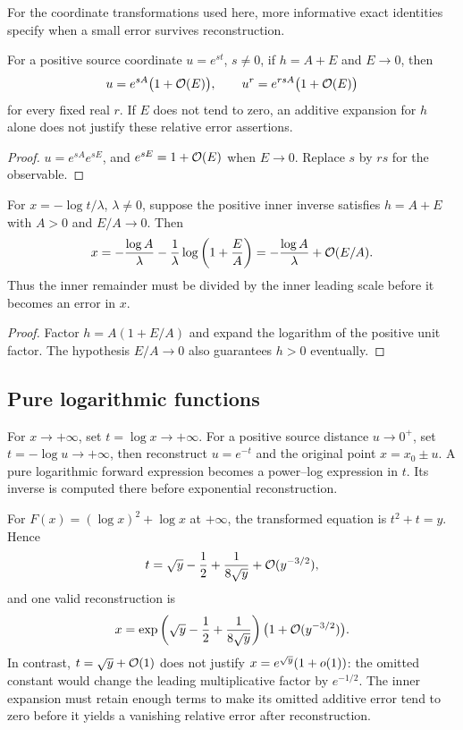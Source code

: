 For the coordinate transformations used here, more informative exact identities specify when a small error survives reconstruction.

\begin{corollary}
\label{cor:exponential-reconstruction}
For a positive source coordinate $u=e^{s t}$, $s\ne0$, if $h=A+E$ and $E\to0$, then
\begin{equation}
 u=e^{sA}\bigl(1+\mathcal O(E)\bigr),\qquad
 u^r=e^{rsA}\bigl(1+\mathcal O(E)\bigr)
 \label{eq:exponential-reconstruction}
\end{equation}
for every fixed real $r$. If $E$ does not tend to zero, an additive expansion for $h$ alone does not justify these relative error assertions.
\end{corollary}
\begin{proof}
$u=e^{sA}e^{sE}$, and $e^{sE}=1+\mathcal O(E)$ when $E\to0$. Replace $s$ by $rs$ for the observable.
\end{proof}

\begin{corollary}
\label{cor:logarithmic-reconstruction}
For $x=-\log t/\lambda$, $\lambda\ne0$, suppose the positive inner inverse satisfies $h=A+E$ with $A>0$ and $E/A\to0$. Then
\begin{equation}
 x=-\frac{\log A}{\lambda}
 -\frac1\lambda\log\left(1+\frac EA\right)
 =-\frac{\log A}{\lambda}+\mathcal O(E/A).
 \label{eq:logarithmic-reconstruction}
\end{equation}
Thus the inner remainder must be divided by the inner leading scale before it becomes an error in $x$.
\end{corollary}
\begin{proof}
Factor $h=A(1+E/A)$ and expand the logarithm of the positive unit factor. The hypothesis $E/A\to0$ also guarantees $h>0$ eventually.
\end{proof}

\subsection{Pure logarithmic functions}

For $x\to+\infty$, set $t=\log x\to+\infty$. For a positive source distance $u\to0^+$, set $t=-\log u\to+\infty$, then reconstruct $u=e^{-t}$ and the original point $x=x_0\pm u$. A pure logarithmic forward expression becomes a power--log expression in $t$. Its inverse is computed there before exponential reconstruction.

\begin{example}
For $F(x)=(\log x)^2+\log x$ at $+\infty$, the transformed equation is $t^2+t=y$. Hence
\[
 t=\sqrt y-\frac12+\frac1{8\sqrt y}+\mathcal O(y^{-3/2}),
\]
and one valid reconstruction is
\[
 x=\exp\left(\sqrt y-\frac12+\frac1{8\sqrt y}\right)
 \bigl(1+\mathcal O(y^{-3/2})\bigr).
\]
In contrast, $t=\sqrt y+\mathcal O(1)$ does not justify $x=e^{\sqrt y}(1+o(1))$: the omitted constant would change the leading multiplicative factor by $e^{-1/2}$. The inner expansion must retain enough terms to make its omitted additive error tend to zero before it yields a vanishing relative error after reconstruction.
\end{example}

